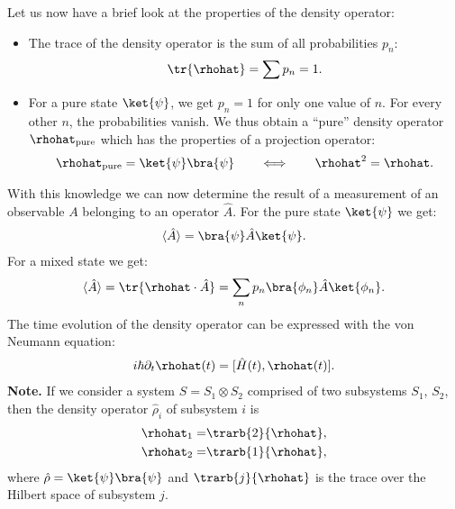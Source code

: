Let us now have a brief look at the properties of the density operator:
\begin{itemize}
    \item The trace of the density operator is the sum of all probabilities $p_n$:
	\begin{align}
	    \tr{\rhohat} = \sum p_n = 1.
	\end{align}
	\item For a pure state $\ket{\psi}$, we get $p_n=1$ for only one value of $n$. For every other $n$, the probabilities vanish. We thus obtain a ``pure'' density operator $\rhohat_{\text{pure}}$ which has the properties of a projection operator:
	\begin{align}
					\rhohat_{\text{pure}} = \ket{\psi}\bra{\psi} \qquad \Longleftrightarrow \qquad \rhohat^2 = \rhohat.
				\end{align}
\end{itemize}
With this knowledge we can now determine the result of a measurement of an observable $A$ belonging to an operator $\hat{A}$. For the pure state $\ket{\psi}$ we get:
%
\begin{align}
				\langle \hat{A}\rangle = \bra{\psi} \hat{A} \ket{\psi}.
\end{align}
For a mixed state we get:
\begin{align}
	\langle \hat{A}\rangle = \tr{\rhohat \cdot \hat{A}} = \sum_n {p_n} \bra{\phi_n} \hat{A} \ket{\phi_n}.
\end{align}
The time evolution of the density operator can be expressed with the von Neumann equation:
\begin{align}
	i\hbar \partial_{t}\rhohat(t) = [\hat{H}(t),\rhohat(t)].
\end{align}
\textbf{Note.} 
If we consider a system $S = S_1 \otimes S_2$ comprised of two subsystems $S_1$, $S_2$, then the density operator $\hat{\rho}_i$ of  subsystem $i$ is
					\begin{align}
						\rhohat_1=&\trarb{2}{\rhohat},\\
						\rhohat_2=&\trarb{1}{\rhohat},
					\end{align}
					where $\hat{\rho}=\ket{\psi}\bra{\psi}$ and $\trarb{j}{\rhohat}$ is the trace over the Hilbert space of subsystem $j$.


